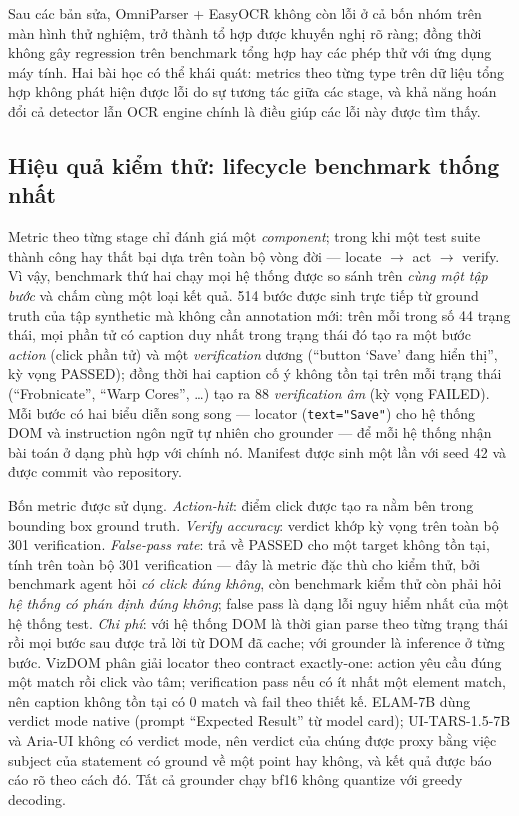 \documentclass[11pt,a4paper]{article}
\newcommand{\code}[1]{\texttt{#1}}
\begin{document}
Sau các bản sửa, OmniParser + EasyOCR không còn lỗi ở cả bốn nhóm trên màn hình thử
nghiệm, trở thành tổ hợp được khuyến nghị rõ ràng; đồng thời không gây regression
trên benchmark tổng hợp hay các phép thử với ứng dụng máy tính. Hai bài học có thể
khái quát: metrics theo từng type trên dữ liệu tổng hợp không phát hiện được lỗi do
sự tương tác giữa các stage, và khả năng hoán đổi cả detector lẫn OCR engine chính
là điều giúp các lỗi này được tìm thấy.

\subsection{Hiệu quả kiểm thử: lifecycle benchmark thống nhất}
\label{sec:lifecycle}
Metric theo từng stage chỉ đánh giá một \emph{component}; trong khi một test suite
thành công hay thất bại dựa trên toàn bộ vòng đời --- locate $\rightarrow$ act
$\rightarrow$ verify. Vì vậy, benchmark thứ hai chạy mọi hệ thống được so sánh trên
\emph{cùng một tập bước} và chấm cùng một loại kết quả. 514 bước được sinh trực tiếp
từ ground truth của tập synthetic mà không cần annotation mới: trên mỗi trong số 44
trạng thái, mọi phần tử có caption duy nhất trong trạng thái đó tạo ra một bước
\emph{action} (click phần tử) và một \emph{verification} dương (``button `Save' đang
hiển thị'', kỳ vọng PASSED); đồng thời hai caption cố ý không tồn tại trên mỗi trạng
thái (``Frobnicate'', ``Warp Cores'', \ldots) tạo ra 88 \emph{verification âm}
(kỳ vọng FAILED). Mỗi bước có hai biểu diễn song song --- locator
(\code{text="Save"}) cho hệ thống DOM và instruction ngôn ngữ tự nhiên cho grounder
--- để mỗi hệ thống nhận bài toán ở dạng phù hợp với chính nó. Manifest được sinh một
lần với seed 42 và được commit vào repository.

Bốn metric được sử dụng. \emph{Action-hit}: điểm click được tạo ra nằm bên trong
bounding box ground truth. \emph{Verify accuracy}: verdict khớp kỳ vọng trên toàn bộ
301 verification. \emph{False-pass rate}: trả về PASSED cho một target không tồn tại,
tính trên toàn bộ 301 verification --- đây là metric đặc thù cho kiểm thử, bởi benchmark
agent hỏi \emph{có click đúng không}, còn benchmark kiểm thử còn phải hỏi \emph{hệ thống
có phán định đúng không}; false pass là dạng lỗi nguy hiểm nhất của một hệ thống test.
\emph{Chi phí}: với hệ thống DOM là thời gian parse theo từng trạng thái rồi mọi bước
sau được trả lời từ DOM đã cache; với grounder là inference ở từng bước. VizDOM phân
giải locator theo contract exactly-one: action yêu cầu đúng một match rồi click vào tâm;
verification pass nếu có ít nhất một element match, nên caption không tồn tại có 0 match
và fail theo thiết kế. ELAM-7B dùng verdict mode native (prompt ``Expected Result'' từ
model card); UI-TARS-1.5-7B và Aria-UI không có verdict mode, nên verdict của chúng được
proxy bằng việc subject của statement có ground về một point hay không, và kết quả được
báo cáo rõ theo cách đó. Tất cả grounder chạy bf16 không quantize với greedy decoding.
\end{document}
